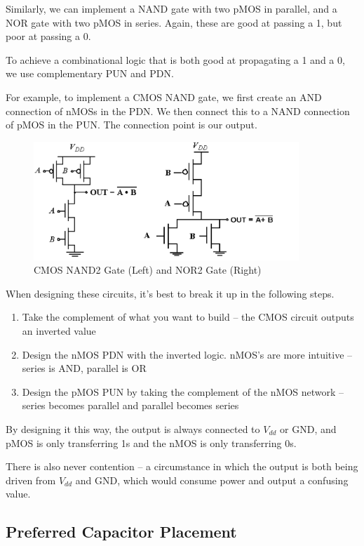 \documentclass{article}
\begin{document}
Similarly, we can implement a NAND gate with two pMOS in parallel, and a NOR gate with two pMOS in series. Again, these are good at passing a 1, but poor at passing a 0. 

To achieve a combinational logic that is both good at propagating a 1 and a 0, we use complementary PUN and PDN. 

For example, to implement a CMOS NAND gate, we first create an AND connection of nMOSs in the PDN. We then connect this to a NAND connection of pMOS in the PUN. The connection point is our output.

\begin{figure}[ht!]
\centering
\includegraphics[width=100mm]{NAND2.png}
\caption{CMOS NAND2 Gate (Left) and NOR2 Gate (Right)}
\end{figure}

When designing these circuits, it's best to break it up in the following steps.

\begin{enumerate}
\item Take the complement of what you want to build -- the CMOS circuit outputs an inverted value

\item Design the nMOS PDN with the inverted logic. nMOS's are more intuitive -- series is AND, parallel is OR

\item Design the pMOS PUN by taking the complement of the nMOS network -- series becomes parallel and parallel becomes series
\end{enumerate}

By designing it this way, the output is always connected to $V_{dd}$ or GND, and pMOS is only transferring 1s and the nMOS is only transferring 0s.

There is also never contention -- a circumstance in which the output is both being driven from $V_{dd}$ and GND, which would consume power and output a confusing value.

\subsection{Preferred Capacitor Placement}
\end{document}
